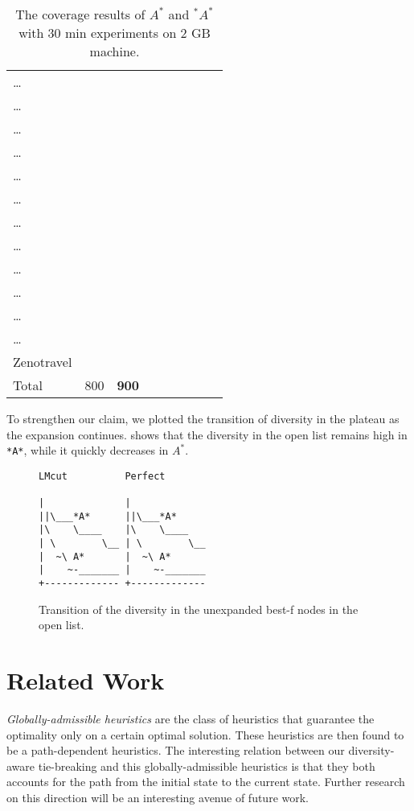 {\begin{table}[htb]
\begin{tabular}{l|ll|ll|ll|ll|}
\ldots{} &  &  &  &  &  &  &  & \\
\ldots{} &  &  &  &  &  &  &  & \\
\ldots{} &  &  &  &  &  &  &  & \\
\ldots{} &  &  &  &  &  &  &  & \\
\ldots{} &  &  &  &  &  &  &  & \\
\ldots{} &  &  &  &  &  &  &  & \\
\ldots{} &  &  &  &  &  &  &  & \\
\ldots{} &  &  &  &  &  &  &  & \\
\ldots{} &  &  &  &  &  &  &  & \\
\ldots{} &  &  &  &  &  &  &  & \\
\ldots{} &  &  &  &  &  &  &  & \\
\ldots{} &  &  &  &  &  &  &  & \\
Zenotravel &  &  &  &  &  &  &  & \\
\hline
Total & 800 & \textbf{900} &  &  &  &  &  & \\
\end{tabular}
\caption{The coverage results of $A^*$ and $^*A^*$ with 30 min experiments on 2 GB machine.}
\label{tbl:main}
\end{table}

}

To strengthen our claim, we plotted the transition of diversity in the plateau as the expansion continues.  shows that the diversity in the open list remains high in \verb~*A*~, while it quickly decreases in $A^*$. 

\begin{figure}[htbp]
\begin{verbatim}
LMcut          Perfect       
                             
|              |             
||\___*A*      ||\___*A*      
|\    \____    |\    \____   
| \        \__ | \        \__
|  ~\ A*       |  ~\ A*      
|    ~-_______ |    ~-_______
+------------- +-------------
\end{verbatim}
\caption{Transition of the diversity in the unexpanded best-f nodes in the open list.}
\label{diversity-transition}
\end{figure}

\section{Related Work}
\label{sec-4}
\emph{Globally-admissible heuristics} \cite{karpas2012optimal} are the class of heuristics that guarantee the optimality only on a certain optimal solution. These heuristics are then found to be a path-dependent heuristics. The interesting relation between our diversity-aware tie-breaking and this globally-admissible heuristics is that they both accounts for the path from the initial state to the current state. Further research on this direction will be an interesting avenue of  future work.


